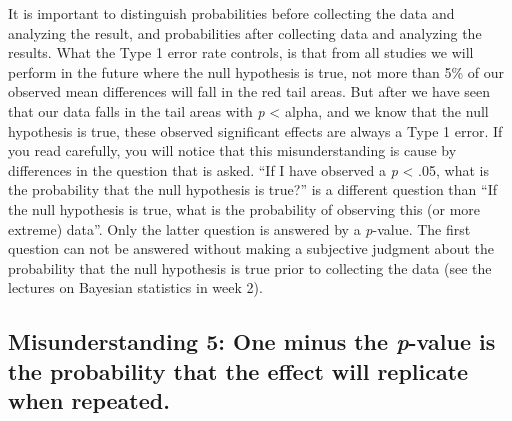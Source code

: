 \documentclass[
]{krantz}
\begin{document}
It is important to distinguish probabilities before collecting the data and analyzing the result, and probabilities after collecting data and analyzing the results. What the Type 1 error rate controls, is that from all studies we will perform in the future where the null hypothesis is true, not more than 5\% of our observed mean differences will fall in the red tail areas. But after we have seen that our data falls in the tail areas with \emph{p} \textless{} alpha, and we know that the null hypothesis is true, these observed significant effects are always a Type 1 error. If you read carefully, you will notice that this misunderstanding is cause by differences in the question that is asked. ``If I have observed a \emph{p} \textless{} .05, what is the probability that the null hypothesis is true?'' is a different question than ``If the null hypothesis is true, what is the probability of observing this (or more extreme) data''. Only the latter question is answered by a \emph{p}-value. The first question can not be answered without making a subjective judgment about the probability that the null hypothesis is true prior to collecting the data (see the lectures on Bayesian statistics in week 2).

\hypertarget{misunderstanding-5-one-minus-the-p-value-is-the-probability-that-the-effect-will-replicate-when-repeated.}{%
\subsection{\texorpdfstring{Misunderstanding 5: One minus the \emph{p}-value is the probability that the effect will replicate when repeated.}{Misunderstanding 5: One minus the p-value is the probability that the effect will replicate when repeated.}}\label{misunderstanding-5-one-minus-the-p-value-is-the-probability-that-the-effect-will-replicate-when-repeated.}}
\end{document}
